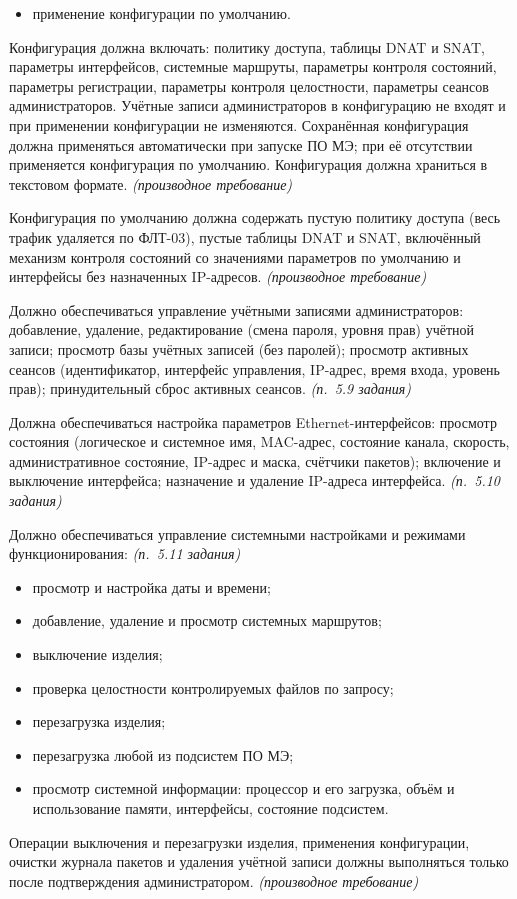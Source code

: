 \documentclass[12pt,a4paper,final]{article}
\newenvironment{reqs}
  {\begin{description}[style=sameline,leftmargin=2.2cm,labelwidth=2.0cm,
     labelsep=0.2cm,font=\normalfont\bfseries,itemsep=3pt]}
  {\end{description}}
\newcommand{\src}[1]{\textit{(п.~#1 задания)}}
\newcommand{\der}{\textit{(производное требование)}}
\begin{document}
\begin{reqs}
\begin{itemize}
  \item применение конфигурации по умолчанию.
  \end{itemize}
\item[УПР-10] Конфигурация должна включать: политику доступа, таблицы DNAT и SNAT, параметры
  интерфейсов, системные маршруты, параметры контроля состояний, параметры
  регистрации, параметры контроля целостности, параметры сеансов администраторов.
  Учётные записи администраторов в конфигурацию не входят и при применении
  конфигурации не изменяются. Сохранённая конфигурация должна применяться
  автоматически при запуске ПО МЭ; при её отсутствии применяется конфигурация
  по умолчанию. Конфигурация должна храниться в текстовом формате. \der
\item[УПР-11] Конфигурация по умолчанию должна содержать пустую политику доступа
  (весь трафик удаляется по ФЛТ-03), пустые таблицы DNAT и SNAT, включённый механизм контроля состояний со
  значениями параметров по умолчанию и интерфейсы без назначенных IP-адресов. \der
\item[УПР-12] Должно обеспечиваться управление учётными записями
  администраторов: добавление, удаление, редактирование (смена пароля, уровня
  прав) учётной записи; просмотр базы учётных записей (без паролей); просмотр
  активных сеансов (идентификатор, интерфейс управления, IP-адрес, время входа,
  уровень прав); принудительный сброс активных сеансов. \src{5.9}
\item[УПР-13] Должна обеспечиваться настройка параметров Ethernet-интерфейсов:
  просмотр состояния (логическое и системное имя, MAC-адрес, состояние канала,
  скорость, административное состояние, IP-адрес и маска, счётчики пакетов);
  включение и выключение интерфейса; назначение и удаление IP-адреса
  интерфейса. \src{5.10}
\item[УПР-14] Должно обеспечиваться управление системными настройками
  и режимами функционирования: \src{5.11}
  \begin{itemize}
  \item просмотр и настройка даты и времени;
  \item добавление, удаление и просмотр системных маршрутов;
  \item выключение изделия;
  \item проверка целостности контролируемых файлов по запросу;
  \item перезагрузка изделия;
  \item перезагрузка любой из подсистем ПО МЭ;
  \item просмотр системной информации: процессор и его загрузка, объём
    и использование памяти, интерфейсы, состояние подсистем.
  \end{itemize}
\item[УПР-15] Операции выключения и перезагрузки изделия, применения
  конфигурации, очистки журнала пакетов и удаления учётной записи должны
  выполняться только после подтверждения администратором. \der
\end{reqs}
\end{document}
